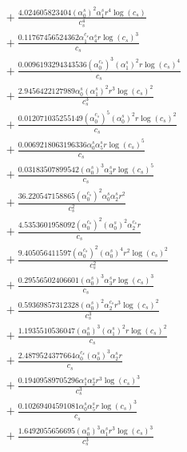 \documentclass[10pt]{article}
\begin{document}
\begin{align*}
&{}  + \frac{4.024605823404 \left(\alpha_{0}^s\right)^{2} \alpha_{1}^s r^{4} \log{\left(c_{s} \right)}}{c_{s}^{4}} \\
&{}  + \frac{0.11767456524362 \alpha_{1}^{c_s} \alpha_{4}^s r \log{\left(c_{s} \right)}^{3}}{c_{s}} \\
&{}  + \frac{0.0096193294343536 \left(\alpha_{0}^{c_s}\right)^{3} \left(\alpha_{1}^s\right)^{2} r \log{\left(c_{s} \right)}^{4}}{c_{s}} \\
&{}  + \frac{2.9456422127989 \alpha_{0}^s \left(\alpha_{1}^s\right)^{2} r^{3} \log{\left(c_{s} \right)}^{2}}{c_{s}^{3}} \\
&{}  + \frac{0.012071035255149 \left(\alpha_{0}^{c_s}\right)^{5} \left(\alpha_{0}^s\right)^{2} r \log{\left(c_{s} \right)}^{2}}{c_{s}} \\
&{}  + \frac{0.0069218063196336 \alpha_{0}^s \alpha_{5}^s r \log{\left(c_{s} \right)}^{5}}{c_{s}} \\
&{}  + \frac{0.03183507899542 \left(\alpha_{0}^s\right)^{3} \alpha_{3}^s r \log{\left(c_{s} \right)}^{5}}{c_{s}} \\
&{}  + \frac{36.220547158865 \left(\alpha_{0}^{c_s}\right)^{2} \alpha_{0}^s \alpha_{2}^s r^{2}}{c_{s}^{2}} \\
&{}  + \frac{4.5353601958092 \left(\alpha_{0}^{c_s}\right)^{2} \left(\alpha_{0}^s\right)^{2} \alpha_{2}^{c_s} r}{c_{s}} \\
&{}  + \frac{9.405056411597 \left(\alpha_{0}^{c_s}\right)^{2} \left(\alpha_{0}^s\right)^{4} r^{2} \log{\left(c_{s} \right)}^{2}}{c_{s}^{2}} \\
&{}  + \frac{0.29556502406601 \left(\alpha_{0}^s\right)^{3} \alpha_{3}^s r \log{\left(c_{s} \right)}^{3}}{c_{s}} \\
&{}  + \frac{0.59369857312328 \left(\alpha_{0}^s\right)^{2} \alpha_{2}^{c_s} r^{3} \log{\left(c_{s} \right)}^{2}}{c_{s}^{3}} \\
&{}  + \frac{1.1935510536047 \left(\alpha_{0}^s\right)^{3} \left(\alpha_{1}^s\right)^{2} r \log{\left(c_{s} \right)}^{2}}{c_{s}} \\
&{}  + \frac{2.4879524377664 \alpha_{0}^{c_s} \left(\alpha_{0}^s\right)^{3} \alpha_{2}^s r}{c_{s}} \\
&{}  + \frac{0.19409589705296 \alpha_{1}^s \alpha_{2}^s r^{3} \log{\left(c_{s} \right)}^{3}}{c_{s}^{3}} \\
&{}  + \frac{0.10269404591081 \alpha_{0}^s \alpha_{5}^s r \log{\left(c_{s} \right)}^{3}}{c_{s}} \\
&{}  + \frac{1.6492055656695 \left(\alpha_{0}^s\right)^{3} \alpha_{1}^s r^{3} \log{\left(c_{s} \right)}^{3}}{c_{s}^{3}} \\

\end{align*}
\end{document}
